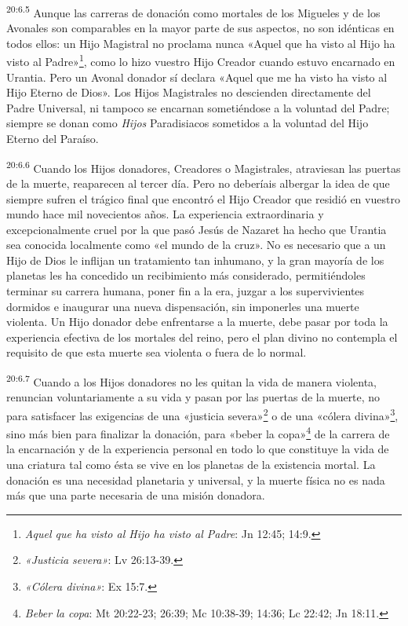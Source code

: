 \par
\textsuperscript{20:6.5} Aunque las carreras de donación como mortales de los Migueles y de los Avonales son comparables en la mayor parte de sus aspectos, no son idénticas en todos ellos: un Hijo Magistral no proclama nunca «Aquel que ha visto al Hijo ha visto al Padre»\footnote{\textit{Aquel que ha visto al Hijo ha visto al Padre}: Jn 12:45; 14:9.}, como lo hizo vuestro Hijo Creador cuando estuvo encarnado en Urantia. Pero un Avonal donador sí declara «Aquel que me ha visto ha visto al Hijo Eterno de Dios». Los Hijos Magistrales no descienden directamente del Padre Universal, ni tampoco se encarnan sometiéndose a la voluntad del Padre; siempre se donan como \textit{Hijos} Paradisiacos sometidos a la voluntad del Hijo Eterno del Paraíso.

\par
\textsuperscript{20:6.6} Cuando los Hijos donadores, Creadores o Magistrales, atraviesan las puertas de la muerte, reaparecen al tercer día. Pero no deberíais albergar la idea de que siempre sufren el trágico final que encontró el Hijo Creador que residió en vuestro mundo hace mil novecientos años. La experiencia extraordinaria y excepcionalmente cruel por la que pasó Jesús de Nazaret ha hecho que Urantia sea conocida localmente como «el mundo de la cruz». No es necesario que a un Hijo de Dios le inflijan un tratamiento tan inhumano, y la gran mayoría de los planetas les ha concedido un recibimiento más considerado, permitiéndoles terminar su carrera humana, poner fin a la era, juzgar a los supervivientes dormidos e inaugurar una nueva dispensación, sin imponerles una muerte violenta. Un Hijo donador debe enfrentarse a la muerte, debe pasar por toda la experiencia efectiva de los mortales del reino, pero el plan divino no contempla el requisito de que esta muerte sea violenta o fuera de lo normal.

\par
\textsuperscript{20:6.7} Cuando a los Hijos donadores no les quitan la vida de manera violenta, renuncian voluntariamente a su vida y pasan por las puertas de la muerte, no para satisfacer las exigencias de una «justicia severa»\footnote{\textit{«Justicia severa»}: Lv 26:13-39.} o de una «cólera divina»\footnote{\textit{«Cólera divina»}: Ex 15:7.}, sino más bien para finalizar la donación, para «beber la copa»\footnote{\textit{Beber la copa}: Mt 20:22-23; 26:39; Mc 10:38-39; 14:36; Lc 22:42; Jn 18:11.} de la carrera de la encarnación y de la experiencia personal en todo lo que constituye la vida de una criatura tal como ésta se vive en los planetas de la existencia mortal. La donación es una necesidad planetaria y universal, y la muerte física no es nada más que una parte necesaria de una misión donadora.

